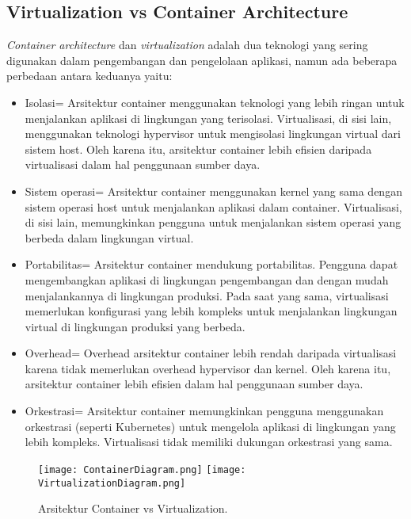\subsection{Virtualization vs Container Architecture}
\textit{Container architecture} dan \textit{virtualization} adalah dua teknologi yang sering digunakan dalam pengembangan dan pengelolaan aplikasi, namun ada beberapa perbedaan antara keduanya yaitu:
\begin{itemize}
	\item Isolasi= Arsitektur container menggunakan teknologi yang lebih ringan untuk menjalankan aplikasi di lingkungan yang terisolasi. Virtualisasi, di sisi lain, menggunakan teknologi hypervisor untuk mengisolasi lingkungan virtual dari sistem host. Oleh karena itu, arsitektur container lebih efisien daripada virtualisasi dalam hal penggunaan sumber daya.
	\item Sistem operasi= Arsitektur container menggunakan kernel yang sama dengan sistem operasi host untuk menjalankan aplikasi dalam container. Virtualisasi, di sisi lain, memungkinkan pengguna untuk menjalankan sistem operasi yang berbeda dalam lingkungan virtual.
	\item Portabilitas= Arsitektur container mendukung portabilitas. Pengguna dapat mengembangkan aplikasi di lingkungan pengembangan dan dengan mudah menjalankannya di lingkungan produksi. Pada saat yang sama, virtualisasi memerlukan konfigurasi yang lebih kompleks untuk menjalankan lingkungan virtual di lingkungan produksi yang berbeda.
	\item Overhead= Overhead arsitektur container lebih rendah daripada virtualisasi karena tidak memerlukan overhead hypervisor dan kernel. Oleh karena itu, arsitektur container lebih efisien dalam hal penggunaan sumber daya.
	\item Orkestrasi= Arsitektur container memungkinkan pengguna menggunakan orkestrasi (seperti Kubernetes) untuk mengelola aplikasi di lingkungan yang lebih kompleks. Virtualisasi tidak memiliki dukungan orkestrasi yang sama.
\end{itemize}

\begin{figure}[h]
	\begin{center}
	\texttt{[image: ContainerDiagram.png]}
	\texttt{[image: VirtualizationDiagram.png]}
	\caption{Arsitektur Container vs Virtualization.}
	\label{fig:ContainerDiagram}
	\end{center}
\end{figure}

